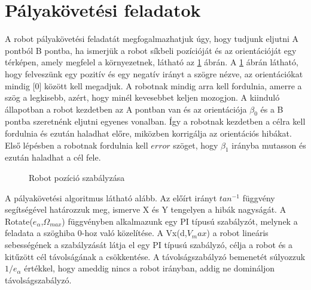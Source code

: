 \section{Pályakövetési feladatok}

A robot pályakövetési feladatát megfogalmazhatjuk úgy, hogy tudjunk eljutni A pontból B pontba, ha ismerjük a robot síkbeli pozícióját és az orientációját egy térképen, amely megfelel a környezetnek, látható az \ref{fig:PositionController} ábrán.
A \ref{fig:PositionController} ábrán látható, hogy felveszünk egy pozitív és egy negatív irányt a szögre nézve, az orientációkat mindig [0\degree] között kell megadjuk. A robotnak mindig arra kell fordulnia, amerre a szög a legkisebb, azért, hogy minél kevesebbet keljen mozogjon.
A kiinduló állapotban a robot kezdetben az A pontban van és az orientációja $\beta_0$ és a B pontba szeretnénk eljutni egyenes vonalban. Így a robotnak kezdetben a célra kell fordulnia és ezután haladhat előre, miközben korrigálja az orientációs hibákat.
Első lépésben a robotnak fordulnia kell $error$ szöget, hogy $\beta_1$ irányba mutasson és ezután haladhat a cél fele.


\begin{figure}[H]
  \caption{Robot pozíció szabályzása}
  \label{fig:PositionController}
\end{figure}


A pályakövetési algoritmus látható alább. Az  előírt irányt $tan^{-1}$ függvény segítségével határozzuk meg, ismerve X és Y tengelyen a hibák nagyságát. A Rotate($e_\alpha$,$\Omega_{max}$) függvényben alkalmazunk egy PI típusú szabályzót, melynek a feladata a szöghiba 0-hoz való közelítése. A Vx(d,$V_max$) a robot lineáris sebességének a szabályzását látja el egy PI típusú szabályzó, célja a robot és a kitűzött cél távolságának a csökkentése. 
A távolságszabályzó bemenetét súlyozzuk $1/e_\alpha$ értékkel, hogy ameddig nincs a robot irányban, addig ne domináljon távolságszabályzó.

